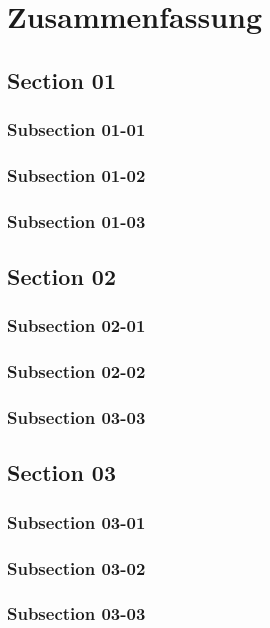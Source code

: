 \chapter{Zusammenfassung}

\bt

\section{Section 01}
\bt
\subsection{Subsection 01-01}
\bt
\subsection{Subsection 01-02}
\bt 
\subsection{Subsection 01-03}

\section{Section 02}
\bt
\subsection{Subsection 02-01}
\bt
\subsection{Subsection 02-02}
\bt
\subsection{Subsection 03-03}
\bt

\section{Section 03}
\bt
\subsection{Subsection 03-01}
\bt
\subsection{Subsection 03-02}
\bt
\subsection{Subsection 03-03}
\bt
